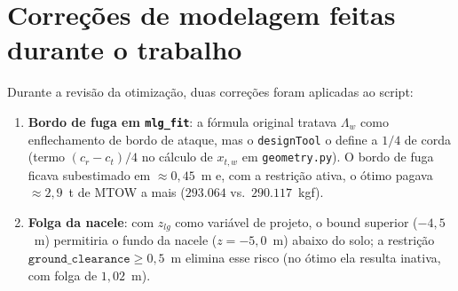 \documentclass[11pt,a4paper]{article}
\begin{document}
\appendix
\section{Correções de modelagem feitas durante o trabalho}

Durante a revisão da otimização, duas correções foram aplicadas ao script:

\begin{enumerate}
\item \textbf{Bordo de fuga em \texttt{mlg\_fit}}: a fórmula original tratava
      $\Lambda_w$ como enflechamento de bordo de ataque, mas o
      \texttt{designTool} o define a $1/4$ de corda (termo
      $(c_r - c_t)/4$ no cálculo de $x_{t,w}$ em \texttt{geometry.py}).
      O bordo de fuga ficava subestimado em $\approx 0{,}45$~m e, com a
      restrição ativa, o ótimo pagava $\approx 2{,}9$~t de MTOW a mais
      ($293.064$ vs.\ $290.117$~kgf).
\item \textbf{Folga da nacele}: com $z_{lg}$ como variável de projeto, o
      bound superior ($-4{,}5$~m) permitiria o fundo da nacele
      ($z = -5{,}0$~m) abaixo do solo; a restrição
      $\texttt{ground\_clearance} \ge 0{,}5$~m elimina esse risco
      (no ótimo ela resulta inativa, com folga de $1{,}02$~m).
\end{enumerate}
\end{document}
